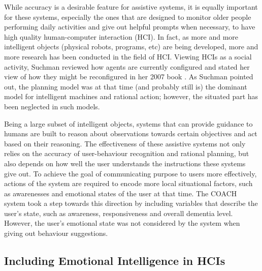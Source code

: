 While accuracy is a desirable feature for assistive systems, it is equally important for these systems, especially the ones that are designed to monitor older people performing daily activities and give out helpful prompts when necessary, to have high quality human-computer interaction (HCI). In fact, as more and more intelligent objects (physical robots, programs, etc) are being developed, more and more research has been conducted in the field of HCI. Viewing HCIs as a social activity, Suchman reviewed how agents are currently configured and stated her view of how they might be reconfigured in her 2007 book \cite{suchman2007human}. As Suchman pointed out, the planning model was at that time (and probably still is) the dominant model for intelligent machines and rational action; however, the situated part has been neglected in such models.

Being a large subset of intelligent objects, systems that can provide guidance to humans are built to reason about observations towards certain objectives and act based on their reasoning. The effectiveness of these assistive systems not only relies on the accuracy of user-behaviour recognition and rational planning, but also depends on how well the user understands the instructions these systems give out. To achieve the goal of communicating purpose to users more effectively, actions of the system are required to encode more local situational factors, such as awarenesses and emotional states of the user at that time. The COACH system \cite{hoey2010automated} took a step towards this direction by including variables that describe the user's state, such as awareness, responsiveness and overall dementia level. However, the user's emotional state was not considered by the system when giving out behaviour suggestions.

\subsection{Including Emotional Intelligence in HCIs}

